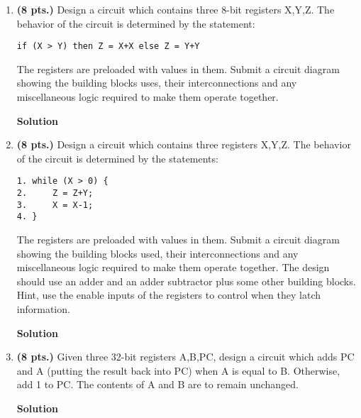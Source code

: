 \begin{enumerate}
    \item \textbf{ (8 pts.)} Design a circuit which contains three 8-bit
        registers X,Y,Z.  The behavior of the circuit is determined by the statement:
\begin{verbatim}
if (X > Y) then Z = X+X else Z = Y+Y
\end{verbatim}
        The registers are preloaded with values in them.
        Submit a circuit diagram showing the building blocks uses,
        their interconnections and any miscellaneous logic required to make
        them operate together.
        \begin{onlysolution}  \textbf{Solution} \itshape{
                \begin{figure}[ht]
                \end{figure}
            }
        \end{onlysolution}

    \item \textbf{ (8 pts.)} Design a circuit which contains three registers X,Y,Z.
        The behavior of the circuit is determined by the statements:
\begin{verbatim}
1. while (X > 0) {
2.     Z = Z+Y;
3.     X = X-1;
4. }
\end{verbatim}
        The registers are preloaded with values in them.
        Submit a circuit diagram showing the building blocks used,
        their interconnections and any miscellaneous logic required to make
        them operate together.  The design should use an adder and an
        adder subtractor plus some other building blocks.  Hint, use
        the enable inputs of the registers to control when they
        latch information.

        \begin{onlysolution}  \textbf{Solution} \itshape{
                \begin{figure}[ht]
                \end{figure}
            }
        \end{onlysolution}

    \item \textbf{ (8 pts.)} Given three 32-bit registers A,B,PC, design a circuit
        which adds PC and A (putting the result back into PC) when A is equal
        to B.  Otherwise, add 1 to PC.  The contents of A and B
        are to remain unchanged.

        \begin{onlysolution}  \textbf{Solution} \itshape{
                \begin{figure}[ht]
                \end{figure}
            }
        \end{onlysolution}


\end{enumerate}
